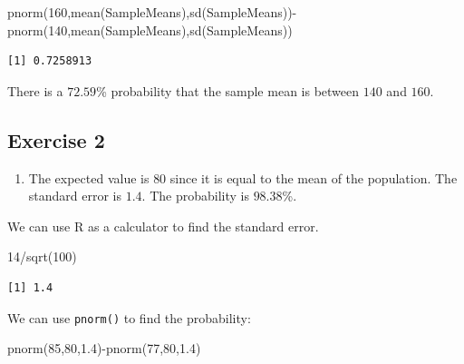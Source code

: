 \documentclass[
  letterpaper,
  DIV=11,
  numbers=noendperiod]{scrreprt}
\newenvironment{Shaded}{\begin{snugshade}}{\end{snugshade}}
\newcommand{\DecValTok}[1]{\textcolor[rgb]{0.68,0.00,0.00}{#1}}
\newcommand{\FloatTok}[1]{\textcolor[rgb]{0.68,0.00,0.00}{#1}}
\newcommand{\FunctionTok}[1]{\textcolor[rgb]{0.28,0.35,0.67}{#1}}
\newcommand{\NormalTok}[1]{\textcolor[rgb]{0.00,0.23,0.31}{#1}}
\newcommand{\SpecialCharTok}[1]{\textcolor[rgb]{0.37,0.37,0.37}{#1}}
\providecommand{\tightlist}{%
  \setlength{\itemsep}{0pt}\setlength{\parskip}{0pt}}\usepackage{longtable,booktabs,array}
\begin{document}
\begin{Shaded}
\begin{Highlighting}[numbers=left,,]
\FunctionTok{pnorm}\NormalTok{(}\DecValTok{160}\NormalTok{,}\FunctionTok{mean}\NormalTok{(SampleMeans),}\FunctionTok{sd}\NormalTok{(SampleMeans))}\SpecialCharTok{{-}}\FunctionTok{pnorm}\NormalTok{(}\DecValTok{140}\NormalTok{,}\FunctionTok{mean}\NormalTok{(SampleMeans),}\FunctionTok{sd}\NormalTok{(SampleMeans))}
\end{Highlighting}
\end{Shaded}

\begin{verbatim}
[1] 0.7258913
\end{verbatim}

There is a \(72.59\)\% probability that the sample mean is between
\(140\) and \(160\).

\hypertarget{exercise-2-21}{%
\subsection*{Exercise 2}\label{exercise-2-21}}

\begin{enumerate}
\def\labelenumi{\arabic{enumi}.}
\tightlist
\item
  The expected value is \(80\) since it is equal to the mean of the
  population. The standard error is \(1.4\). The probability is
  \(98.38\)\%.
\end{enumerate}

We can use R as a calculator to find the standard error.

\begin{Shaded}
\begin{Highlighting}[numbers=left,,]
\DecValTok{14}\SpecialCharTok{/}\FunctionTok{sqrt}\NormalTok{(}\DecValTok{100}\NormalTok{)}
\end{Highlighting}
\end{Shaded}

\begin{verbatim}
[1] 1.4
\end{verbatim}

We can use \texttt{pnorm()} to find the probability:

\begin{Shaded}
\begin{Highlighting}[numbers=left,,]
\FunctionTok{pnorm}\NormalTok{(}\DecValTok{85}\NormalTok{,}\DecValTok{80}\NormalTok{,}\FloatTok{1.4}\NormalTok{)}\SpecialCharTok{{-}}\FunctionTok{pnorm}\NormalTok{(}\DecValTok{77}\NormalTok{,}\DecValTok{80}\NormalTok{,}\FloatTok{1.4}\NormalTok{)}
\end{Highlighting}
\end{Shaded}
\end{document}
